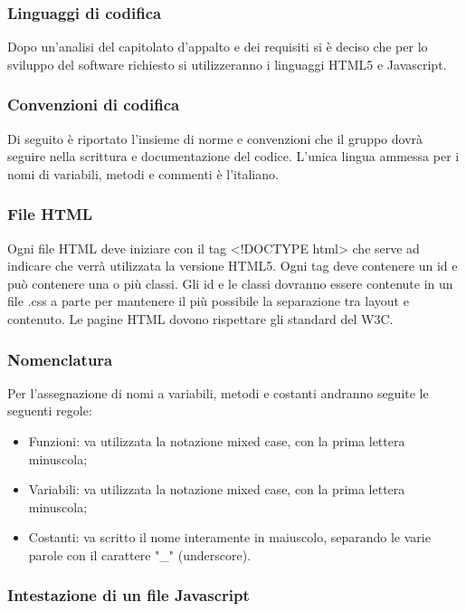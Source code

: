 \subsubsection{Linguaggi di codifica}
Dopo un'analisi del capitolato d'appalto e dei requisiti si è deciso che per lo sviluppo del software richiesto si utilizzeranno i linguaggi HTML5 e Javascript.

\subsubsection{Convenzioni di codifica}
Di seguito è riportato l'insieme di norme e convenzioni che il gruppo dovrà seguire nella scrittura e documentazione del codice.
L'unica lingua ammessa per i nomi di variabili, metodi e commenti è l'italiano.

\subsubsection{File HTML}

Ogni file HTML deve iniziare con il tag <!DOCTYPE html> che serve ad indicare che verrà utilizzata la versione HTML5.
Ogni tag deve contenere un id e può contenere una o più classi.
Gli id e le classi dovranno essere contenute in un file .css a parte per mantenere il più possibile la separazione tra layout e contenuto.
Le pagine HTML dovono rispettare gli standard del W3C.

\subsubsection{Nomenclatura}
Per l'assegnazione di nomi a variabili, metodi e costanti andranno seguite le seguenti regole:
\begin{itemize}
	\item Funzioni: va utilizzata la notazione mixed case, con la prima lettera minuscola;
	\item Variabili: va utilizzata la notazione mixed case, con la prima lettera minuscola;
	\item Costanti: va scritto il nome interamente in maiuscolo, separando le varie parole con il carattere "\_" (underscore).
\end{itemize}

\subsubsection{Intestazione di un file Javascript}

